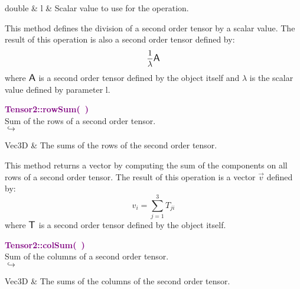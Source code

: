\begin{tcolorbox}[width=\textwidth,myArgs,tabularx={ll|R}]
double & l & Scalar value to use for the operation.
\end{tcolorbox}

This method defines the division of a second order tensor by a scalar value.
The result of this operation is also a second order tensor defined by:
\begin{equation*}
\frac{1}{\lambda} \mbox{\large\ensuremath{\mathsf{A}}}
\end{equation*}
where $\mbox{\large\ensuremath{\mathsf{A}}}$ is a second order tensor defined by the object itself and $\lambda$ is the scalar value defined by parameter l.

\textcolor{purple}{\textbf{Tensor2::rowSum(~)}}\label{Tensor2::rowSum()}\\
Sum of the rows of a second order tensor.\\ \hspace*{5mm}$\hookrightarrow$
\vspace*{-2em}\begin{tcolorbox}[grow to left by=-1cm, width=\textwidth-1cm,myArgs,tabularx={l|R}]
Vec3D & The sums of the rows of the second order tensor.
\end{tcolorbox}

This method returns a vector by computing the sum of the components on all rows of a second order tensor.
The result of this operation is a vector $\overrightarrow{v}$ defined by:
\begin{equation*}
v_{i}=\sum_{j=1}^{3} T_{ji}
\end{equation*}
where $\mbox{\large\ensuremath{\mathsf{T}}}$ is a second order tensor defined by the object itself.

\textcolor{purple}{\textbf{Tensor2::colSum(~)}}\label{Tensor2::colSum()}\\
Sum of the columns of a second order tensor.\\ \hspace*{5mm}$\hookrightarrow$
\vspace*{-2em}\begin{tcolorbox}[grow to left by=-1cm, width=\textwidth-1cm,myArgs,tabularx={l|R}]
Vec3D & The sums of the columns of the second order tensor.
\end{tcolorbox}

